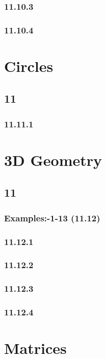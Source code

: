 \documentclass[11pt]{book}
\begin{document}
\subsection{11.10.3}

\subsection{11.10.4}

\chapter{Circles}
\section{11}
\subsection{11.11.1}

\chapter{3D Geometry}
\section{11}
\subsection{Examples:-1-13 (11.12)}

\subsection{11.12.1}

\subsection{11.12.2}

\subsection{11.12.3}

\subsection{11.12.4}

\chapter{Matrices}
\end{document}
